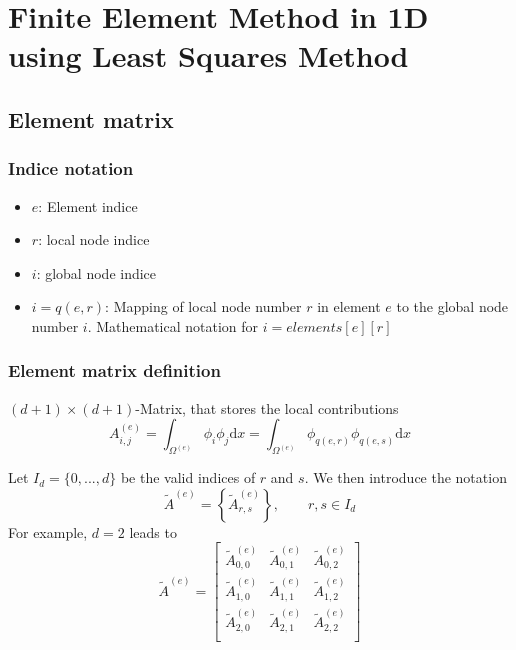 \documentclass[11pt]{article}
\providecommand{\tightlist}{%
      \setlength{\itemsep}{0pt}\setlength{\parskip}{0pt}}
\begin{document}
    \section{Finite Element Method in 1D using Least Squares
Method}\label{finite-element-method-in-1d-using-least-squares-method}

\subsection{Element matrix}\label{element-matrix}

\subsubsection{Indice notation}\label{indice-notation}

\begin{itemize}
\tightlist
\item
  \(e\): Element indice
\item
  \(r\): local node indice
\item
  \(i\): global node indice
\item
  \(i = q(e,r)\): Mapping of local node number \(r\) in element \(e\) to
  the global node number \(i\). Mathematical notation for
  \(i = elements[e][r]\)
\end{itemize}

\subsubsection{Element matrix
definition}\label{element-matrix-definition}

\((d+1)\times(d+1)\)-Matrix, that stores the local contributions \[
A_{i,j}^{(e)} 
= \int_{\Omega^{(e)}} \phi_i \phi_j \text{d}x 
= \int_{\Omega^{(e)}} \phi_{q(e,r)} \phi_{q(e,s)} \text{d}x
\]

Let \(I_d = \{0,...,d\}\) be the valid indices of \(r\) and \(s\). We
then introduce the notation \[
\tilde{A}^{(e)} = \left\{\tilde{A}^{(e)}_{r,s}\right\}, \qquad r,s \in I_d
\] For example, \(d=2\) leads to \[
\tilde{A}^{(e)} = 
\begin{bmatrix}
\tilde{A}^{(e)}_{0,0} & \tilde{A}^{(e)}_{0,1} & \tilde{A}^{(e)}_{0,2} \\
\tilde{A}^{(e)}_{1,0} & \tilde{A}^{(e)}_{1,1} & \tilde{A}^{(e)}_{1,2} \\
\tilde{A}^{(e)}_{2,0} & \tilde{A}^{(e)}_{2,1} & \tilde{A}^{(e)}_{2,2} \\
\end{bmatrix}
\]
\end{document}
